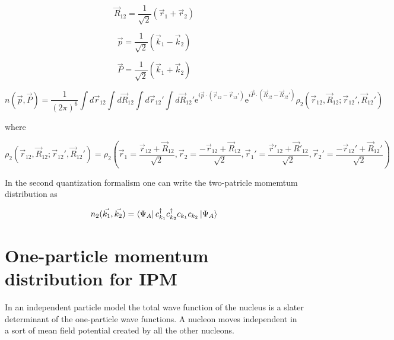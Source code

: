 \documentclass[12pt]{article}
\begin{document}
\begin{equation}
\vec{R}_{12}= \frac{1}{\sqrt{2}} \left(\vec{r}_1 + \vec{r}_2\right)
\end{equation}

\begin{equation}
\vec{p}= \frac{1}{\sqrt{2}} \left(\vec{k}_1 - \vec{k}_2\right)
\end{equation}

\begin{equation}
\vec{P}= \frac{1}{\sqrt{2}} \left(\vec{k}_1 + \vec{k}_2\right)
\end{equation}


\begin{equation}
n(\vec{p},\vec{P})=\frac{1}{(2\pi)^6}
						\int d\vec{r}_{12} \int d\vec{R}_{12} \int d\vec{r}_{12}' \int d\vec{R}_{12}' 
    						\mathrm{e}^{i\vec{p}\cdot (\vec{r}_{12}-\vec{r}_{12}')} 
    						\mathrm{e}^{i\vec{P}\cdot(\vec{R}_{12}-\vec{R}_{12}')} 
    						\rho_2(\vec{r}_{12},\vec{R}_{12}; \vec{r}_{12}',\vec{R}_{12}')
\end{equation}

where 

\begin{equation}
\rho_2(\vec{r}_{12},\vec{R}_{12}; \vec{r}_{12}',\vec{R}_{12}') = 
							\rho_2\left(	
							\vec{r}_1=\frac{\vec{r}_{12} + \vec{R}_{12}}{\sqrt{2}},
							\vec{r}_2=\frac{-\vec{r}_{12} + \vec{R}_{12}}{\sqrt{2}},
						    \vec{r}_1'=\frac{\vec{r}'_{12} + \vec{R}'_{12}}{\sqrt{2}},	
						    \vec{r}_2'=\frac{-\vec{r}_{12}' + \vec{R}_{12}'}{\sqrt{2}}
						    \right)
\end{equation}

In the second quantization formalism one can write the two-patricle momemtum distribution as

\begin{equation}
n_2(\vec{k_1},\vec{k_2})= \bra{\Psi_A} c^\dagger_{k_1} c^\dagger_{k_2} c_{k_1} c_{k_2} \ket{\Psi_A}
\end{equation}

 





\section{One-particle momentum distribution for IPM}

In an independent particle model the total wave function of the nucleus is a slater determinant of the one-particle wave functions. A nucleon moves independent in a sort of mean field potential created by all the other nucleons. 
\end{document}
